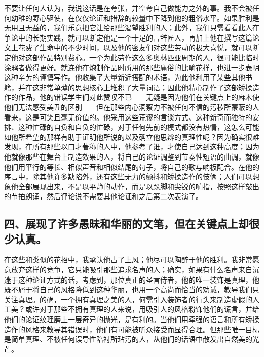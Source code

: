 不要让任何人认为，我说这话是在夸张，并空夸自己做能力之外的事。我不会被任何幼稚的野心驱使，在仅仅论证和措辞的较量中下降到他的粗俗水平。如果胜利是无用且无益的，我们乐意把它让给那些渴望胜利的人；此外，我们只需看看此人在争论中的长期实践，就可以断定他是一个十足的言辞匠人，再加上他在撰写这篇论文上花费了生命中的不少时间，以及他的密友们对这些劳动的极大喜悦，就可以断定他对这部作品特别费心。一个为此劳作这么多奥林匹亚周期的人，很可能比临时涂鸦者做得更好。就连他在炮制作品时所用的那些庸俗的比喻花样，也进一步表明这种辛劳的谨慎写作。他收集了大量新近搭配的术语，为此他利用了某些其他书籍，并在这非常单薄的思想核心上堆积了大量词语；因此他精心制作了这部矫揉造作的作品，他的错误学生们对此赞叹不已——无疑是因为他们在关键点上的麻木使他们无法感受美丑的区别——但在那些内心洞察力不被任何不信的污秽所蒙蔽的人看来，这是可笑且毫无价值的。他采用这些荒谬的言谈方式、这种新奇而独特的安排、这种忙碌的自负和自负的忙碌，对于任何先前的模式都没有热情，这怎么可能如他所希望的那样有助于证明他所说的以及确立他思辨的真理性呢？因为确实很难发现，在所有那些以口才著称的人中，他参考了谁，才使自己达到这种高度；因为他就像那些在舞台上制造效果的人，将自己的论证调整到节奏性短语的曲调，就像他们用平行的等长、相似声音和相似结尾的句子，将自己的歌与响板配合。在他的序言中，除其他许多缺陷外，还有这些无力的颤抖和矫揉造作的伎俩；人们可以想象他全部展现出来，不是以平静的动作，而是以跺脚和尖锐的响指，按照这样敲出的节拍朗诵，然后评论说不需要其他论证和之后第二次表演了。\par


\subsection{四、展现了许多愚昧和华丽的文笔，但在关键点上却很少认真。}

在这些和类似的花招中，我承认他占了上风；他尽可以陶醉于他的胜利。我非常愿意放弃这样的竞争，它只能吸引那些追求名声的人；确实，如果有什么名声来自沉迷于这种论证方式的话，考虑到，那位真正的圣言侍者，他的唯一装饰是真理，他既不屑于将自己的风格降低到这种华丽，也用一个高尚而恰当的劝诫，教导我们只关注真理。的确，一个拥有真理之美的人，何需引入装饰者的行头来制造虚假的人工美？或许对于那些不拥有真理的人来说，用吸引人的风格粉饰他们的谎言，并给他们的论证纹理磨上一层奇异的抛光，是有利的。当他们用牵强的语言和所有矫揉造作的风格来教导其错误时，他们有可能被听众接受而显得合理。但那些唯一目标是简单真理、不被任何误导性陪衬所玷污的人，从他们的话语中散发出自然美的光芒。\par

